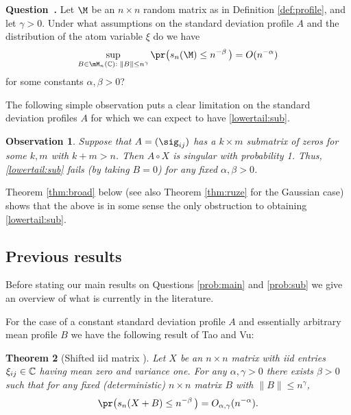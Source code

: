 \documentclass[aop,preprint]{imsart}
\theoremstyle{plain}
\newtheorem{theorem}{Theorem}[section]
\newtheorem{observation}[theorem]{Observation}
\theoremstyle{definition}
\theoremstyle{remark}
\newcounter{question}[section]
\newenvironment{question}[1][]{\refstepcounter{question}\par\medskip
   \noindent\textbf{Question~\thequestion. #1} \rmfamily}{\medskip}
\renewcommand*{\thequestion}{\Alph{question}}
\numberwithin{equation}{section}
\numberwithin{theorem}{section}
\begin{document}
\begin{question}	\label{prob:sub}
Let $\M$ be an $n\times n$ random matrix as in Definition \ref{def:profile}, and let $\gamma>0$.
Under what assumptions on the standard deviation profile $A$ 
and the distribution of the atom variable $\xi$ do we have
\begin{equation}	\label{lowertail:sub}
\sup_{B\in \mM_n(\C): \; \|B\|\le n^\gamma}\pr\big( s_n(\M) \le n^{-\beta}\,\big) = O(n^{-\alpha})
\end{equation}
for some constants $\alpha,\beta>0$?
\end{question}

The following simple observation puts a clear limitation on the standard deviation profiles $A$ for which we can expect to have \eqref{lowertail:sub}.

\begin{observation}	\label{obs:submatrix}
Suppose that $A=(\sig_{ij})$ has a $k\times m$ submatrix of zeros for some $k,m$ with $k+m>n$. 
Then $A\circ X$ is singular with probability 1.
Thus, \eqref{lowertail:sub} fails (by taking $B=0$) for any fixed $\alpha,\beta>0$.
\end{observation}

Theorem \ref{thm:broad} below (see also Theorem \ref{thm:ruze} for the Gaussian case) shows that the above is in some sense the only obstruction to obtaining \eqref{lowertail:sub}.



\subsection{Previous results}	\label{sec:previous}

Before stating our main results on Questions \ref{prob:main} and \ref{prob:sub} we give an overview of what is currently in the literature.

For the case of a constant standard deviation profile $A$ and essentially arbitrary mean profile $B$ we have the following result of Tao and Vu: %

\begin{theorem}[Shifted iid matrix \citep{TaVu:circ}]		\label{thm:tavu}
Let $X$ be an $n\times n$ matrix with iid entries $\xi_{ij}\in {\mathbb C}$ having mean zero and variance one. 
For any $\alpha,\gamma>0$ there exists $\beta>0$ such that for any fixed (deterministic) $n\times n$ matrix $B$ with $\|B\|\le n^\gamma$,
\begin{equation}	\label{tavu:bound}
\pr\big( s_n(X+B) \le n^{-\beta} \,\big) = O_{\alpha,\gamma}(n^{-\alpha}).
\end{equation}
\end{theorem}
\end{document}

